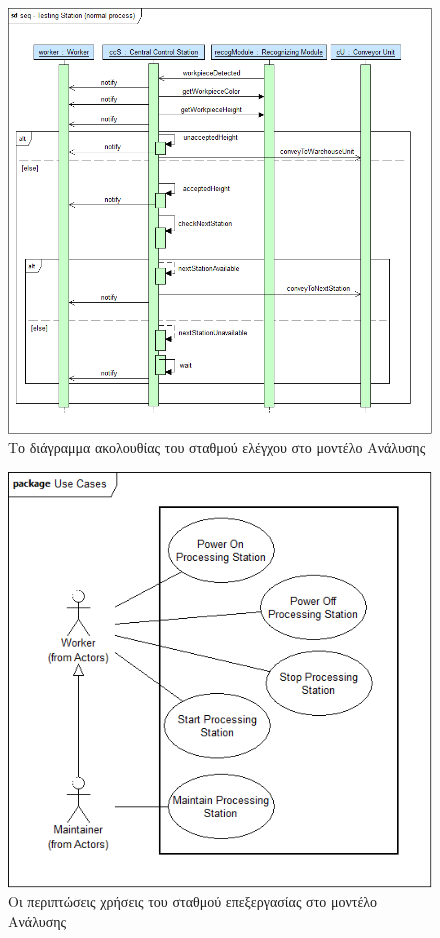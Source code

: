 \documentclass[a4paper,12pt,twoside]{report}
\begin{document}
{\begin{appendices}
			\begin{figure}[hp]
					\centering
					\includegraphics[scale=0.30]{AnalysisModel_seq-TestingStation(normalprocess).png}
					\caption{Το διάγραμμα ακολουθίας του σταθμού ελέγχου στο μοντέλο Ανάλυσης}
					\label{φωτ:Το διάγραμμα ακολουθίας του σταθμού ελέγχου στο μοντέλο Ανάλυσης}
			\end{figure}
			
			\begin{figure}[hp]
					\centering
					\includegraphics[scale=0.30]{AnalysisModel_uc-ProcessingStationsUseCases.png}
					\caption{Οι περιπτώσεις χρήσεις του σταθμού επεξεργασίας στο μοντέλο Ανάλυσης}
					\label{φωτ:Οι περιπτώσεις χρήσεις του σταθμού επεξεργασίας στο μοντέλο Ανάλυσης}
			\end{figure}
			

\end{appendices}}
\end{document}
